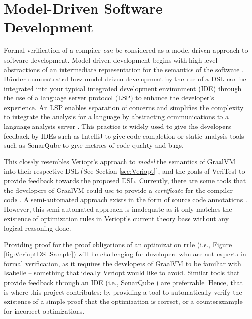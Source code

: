 \section{Model-Driven Software Development}
\label{sec:modelDrivenDevelopment}

Formal verification of a compiler \emph{can} be considered as a model-driven approach to software development. Model-driven development 
begins with high-level abstractions of an intermediate representation for the semantics of the software \cite[p. 43]{sendall_model_2003}.
Bünder \cite{bunder_decoupling_2019} demonstrated how model-driven development by the use of a DSL can be integrated into your typical 
integrated development environment (IDE) through the use of a language server protocol (LSP) to enhance the developer's experience. 
An LSP enables separation of concerns and simplifies the complexity to integrate the analysis for a language by abstracting communications 
to a language analysis server \cite[Sec. 3.1]{bunder_decoupling_2019}. This practice is widely used to give the developers feedback 
\cite[Sec. 3.2]{bunder_decoupling_2019} by IDEs such as IntelliJ \cite{jetbrains_intellij_nodate} to give code completion or 
static analysis tools such as SonarQube \cite{sonarsource_code_nodate} to give metrics of code quality and bugs.

This closely resembles Veriopt's approach to \emph{model} the semantics of GraalVM into their respective DSL (See Section \ref{sec:Veriopt}), 
and the goals of VeriTest to provide feedback towards the proposed DSL.
Currently, there are some tools that the developers of GraalVM could use to provide a \emph{certificate} for the compiler code 
\cite[Sec. 7]{Term_Graph_Optimizations}. A semi-automated approach exists in the form of source code annotations \cite[Sec. 5.1]{Term_Graph_Optimizations}.
However, this semi-automated approach is inadequate as it only matches the existence of optimization rules in Veriopt's current theory base without 
any logical reasoning done. 

Providing proof for the proof obligations of an optimization rule (i.e., Figure \ref{fig:VerioptDSLSample}) will be challenging 
for developers who are not experts in formal verification, as it requires the developers of GraalVM to be familiar with Isabelle -- 
something that ideally Veriopt would like to avoid. Similar tools that provide feedback through an IDE 
(i.e., SonarQube \cite{sonarsource_code_nodate}) are preferrable. Hence, that is where this project contributes: by providing a tool to automatically 
verify the existence of a simple proof that the optimization is correct, or a counterexample for incorrect optimizations.